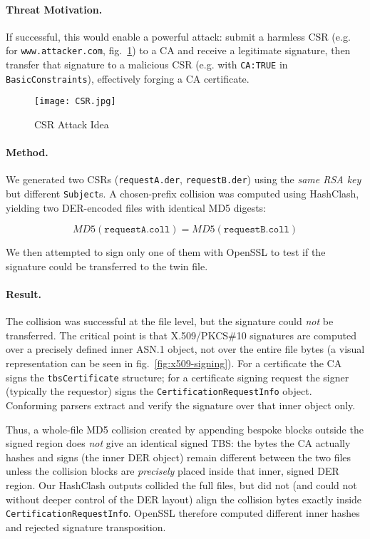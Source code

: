 \documentclass[runningheads]{llncs}
\begin{document}
    \paragraph{Threat Motivation.} If successful, this would enable a powerful attack: submit a harmless CSR (e.g. for \texttt{www.attacker.com}, fig.~\ref{fig:csr-idea}) to a CA and receive a legitimate signature, then transfer that signature to a malicious CSR (e.g. with \texttt{CA:TRUE} in \texttt{BasicConstraints}), effectively forging a CA certificate.

    \begin{figure}
        \centering
        \texttt{[image: CSR.jpg]}
        \caption{CSR Attack Idea}
        \label{fig:csr-idea}
    \end{figure}

    \paragraph{Method.} We generated two CSRs (\texttt{requestA.der}, \texttt{requestB.der}) using the \emph{same RSA key} but different \texttt{Subject}s. A chosen-prefix collision was computed using HashClash, yielding two DER-encoded files with identical MD5 digests:

    \[
        MD5(\texttt{requestA.coll})=MD5(\texttt{requestB.coll})
    \]

    We then attempted to sign only one of them with OpenSSL to test if the signature could be transferred to the twin file.

    \paragraph{Result.} The collision was successful at the file level, but the signature could \emph{not} be transferred. The critical point is that X.509/PKCS\#10 signatures are computed over a precisely defined inner ASN.1 object, not over the entire file bytes (a visual representation can be seen in fig.~\ref{fig:x509-signing}). For a certificate the CA signs the \texttt{tbsCertificate} structure; for a certificate signing request the signer (typically the requestor) signs the \texttt{CertificationRequestInfo} object. Conforming parsers extract and verify the signature over that inner object only.

    Thus, a whole-file MD5 collision created by appending bespoke blocks outside the signed region does \emph{not} give an identical signed TBS: the bytes the CA actually hashes and signs (the inner DER object) remain different between the two files unless the collision blocks are \emph{precisely} placed inside that inner, signed DER region. Our HashClash outputs collided the full files, but did not (and could not without deeper control of the DER layout) align the collision bytes exactly inside \texttt{CertificationRequestInfo}. OpenSSL therefore computed different inner hashes and rejected signature transposition.
\end{document}

